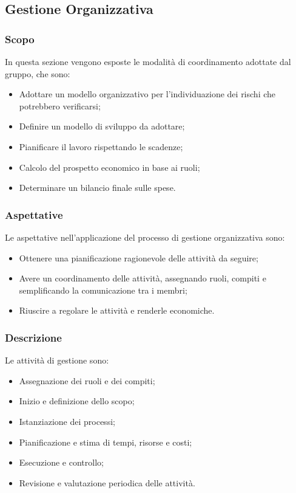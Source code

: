 \subsection{Gestione Organizzativa}
\subsubsection{Scopo}
In questa sezione vengono esposte le modalità di coordinamento adottate dal gruppo, che sono:
\begin{itemize}
\item Adottare un modello organizzativo per l'individuazione dei rischi che potrebbero verificarsi;
\item Definire un modello di sviluppo da adottare;
\item Pianificare il lavoro rispettando le scadenze;
\item Calcolo del prospetto economico in base ai ruoli;
\item Determinare un bilancio finale sulle spese.
\end{itemize}

\subsubsection{Aspettative}
Le aspettative nell'applicazione del processo di gestione organizzativa sono: 
\begin{itemize}
\item Ottenere una pianificazione ragionevole delle attività da seguire;
\item Avere un coordinamento delle attività, assegnando ruoli, compiti e semplificando la comunicazione tra i membri;
\item Riuscire a regolare le attività e renderle economiche.
\end{itemize}

\subsubsection{Descrizione}
Le attività  di gestione sono: 
\begin{itemize}
\item Assegnazione dei ruoli e dei compiti;
\item Inizio e definizione dello scopo;
\item Istanziazione dei processi;
\item Pianificazione e stima di tempi, risorse e costi;
\item Esecuzione e controllo;
\item Revisione e valutazione periodica delle attività.
\end{itemize}

